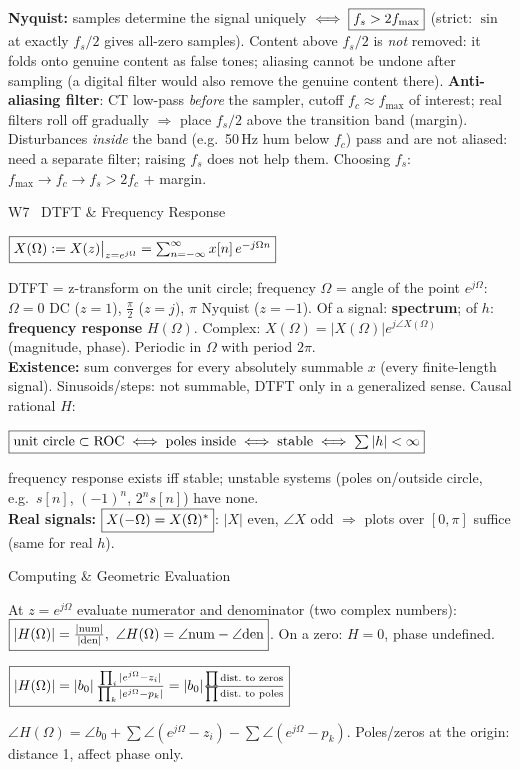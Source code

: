 \documentclass[a4paper,landscape]{article}
\newcommand{\sect}[1]{\par\vspace{1pt}\noindent\colorbox{secblue}{\parbox{\dimexpr\linewidth-2\fboxsep}{\color{white}\bfseries\fontsize{6.8}{7.6}\selectfont\strut #1}}\par\vspace{0.4pt}}
\newcommand{\sub}[1]{\par\vspace{0.6pt}\noindent\colorbox{subblue}{\parbox{\dimexpr\linewidth-2\fboxsep}{\bfseries\strut #1}}\par\vspace{0.2pt}}
\newcommand{\bx}[1]{\fbox{$\textstyle #1$}}
\newcommand{\eqc}[1]{\par\vspace{0.2pt}\centerline{$#1$}\par\vspace{0.2pt}}
\begin{document}
\begin{multicols*}{4}
\textbf{Nyquist:} samples determine the signal uniquely $\iff\bx{f_s>2f_{\max}}$ (strict: $\sin$ at exactly $f_s/2$ gives all-zero samples). Content above $f_s/2$ is \emph{not} removed: it folds onto genuine content as false tones; aliasing cannot be undone after sampling (a digital filter would also remove the genuine content there).
\textbf{Anti-aliasing filter}: CT low-pass \emph{before} the sampler, cutoff $f_c\approx f_{\max}$ of interest; real filters roll off gradually $\Rightarrow$ place $f_s/2$ above the transition band (margin). Disturbances \emph{inside} the band (e.g.\ 50\,Hz hum below $f_c$) pass and are not aliased: need a separate filter; raising $f_s$ does not help them. Choosing $f_s$: $f_{\max}\to f_c\to f_s>2f_c$ + margin.

\sect{W7 \ DTFT \& Frequency Response}
\eqc{\bx{X(\Omega):=X(z)\big|_{z=e^{j\Omega}}=\textstyle\sum_{n=-\infty}^{\infty}x[n]\,e^{-j\Omega n}}}
DTFT = z-transform on the unit circle; frequency $\Omega$ = angle of the point $e^{j\Omega}$: $\Omega{=}0$ DC ($z{=}1$), $\frac\pi2$ ($z{=}j$), $\pi$ Nyquist ($z{=}{-}1$). Of a signal: \textbf{spectrum}; of $h$: \textbf{frequency response} $H(\Omega)$. Complex: $X(\Omega)=|X(\Omega)|e^{j\angle X(\Omega)}$ (magnitude, phase). Periodic in $\Omega$ with period $2\pi$.\\
\textbf{Existence:} sum converges for every absolutely summable $x$ (every finite-length signal). Sinusoids/steps: not summable, DTFT only in a generalized sense. Causal rational $H$:
\eqc{\bx{\text{unit circle}\subset\text{ROC}\iff\text{poles inside}\iff\text{stable}\iff\textstyle\sum|h|<\infty}} frequency response exists iff stable; unstable systems (poles on/outside circle, e.g.\ $s[n]$, $(-1)^n$, $2^ns[n]$) have none.\\
\textbf{Real signals:} $\bx{X(-\Omega)=X(\Omega)^*}$: $|X|$ even, $\angle X$ odd $\Rightarrow$ plots over $[0,\pi]$ suffice (same for real $h$).
\sub{Computing \& Geometric Evaluation}
At $z=e^{j\Omega}$ evaluate numerator and denominator (two complex numbers): $\bx{|H(\Omega)|=\frac{|\mathrm{num}|}{|\mathrm{den}|},\ \angle H(\Omega)=\angle\mathrm{num}-\angle\mathrm{den}}$. On a zero: $H{=}0$, phase undefined.
\eqc{\bx{|H(\Omega)|=|b_0|\,\frac{\prod_i|e^{j\Omega}-z_i|}{\prod_k|e^{j\Omega}-p_k|}=|b_0|\frac{\prod\text{dist.\ to zeros}}{\prod\text{dist.\ to poles}}}}
$\angle H(\Omega)=\angle b_0+\sum\angle(e^{j\Omega}{-}z_i)-\sum\angle(e^{j\Omega}{-}p_k)$. Poles/zeros at the origin: distance 1, affect phase only.

\end{multicols*}
\end{document}
